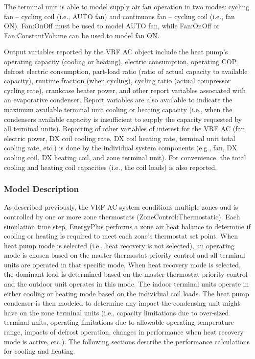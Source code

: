 The terminal unit is able to model supply air fan operation in two modes: cycling fan -- cycling coil (i.e., AUTO fan) and continuous fan -- cycling coil (i.e., fan ON). Fan:OnOff must be used to model AUTO fan, while Fan:OnOff or Fan:ConstantVolume can be used to model fan ON.

Output variables reported by the VRF AC object include the heat pump's operating capacity (cooling or heating), electric consumption, operating COP, defrost electric consumption, part-load ratio (ratio of actual capacity to available capacity), runtime fraction (when cycling), cycling ratio (actual compressor cycling rate), crankcase heater power, and other report variables associated with an evaporative condenser. Report variables are also available to indicate the maximum available terminal unit cooling or heating capacity (i.e., when the condensers available capacity is insufficient to supply the capacity requested by all terminal units). Reporting of other variables of interest for the VRF AC (fan electric power, DX coil cooling rate, DX coil heating rate, terminal unit total cooling rate, etc.) is done by the individual system components (e.g., fan, DX cooling coil, DX heating coil, and zone terminal unit). For convenience, the total cooling and heating coil capacities (i.e., the coil loads) is also reported.

\subsubsection{Model Description}\label{model-description-015}

As described previously, the VRF AC system conditions multiple zones and is controlled by one or more zone thermostats (ZoneControl:Thermostatic). Each simulation time step, EnergyPlus performs a zone air heat balance to determine if cooling or heating is required to meet each zone's thermostat set point. When heat pump mode is selected (i.e., heat recovery is not selected), an operating mode is chosen based on the master thermostat priority control and all terminal units are operated in that specific mode. When heat recovery mode is selected, the dominant load is determined based on the master thermostat priority control and the outdoor unit operates in this mode. The indoor terminal units operate in either cooling or heating mode based on the individual coil loads. The heat pump condenser is then modeled to determine any impact the condensing unit might have on the zone terminal units (i.e., capacity limitations due to over-sized terminal units, operating limitations due to allowable operating temperature range, impacts of defrost operation, changes in performance when heat recovery mode is active, etc.). The following sections describe the performance calculations for cooling and heating.

